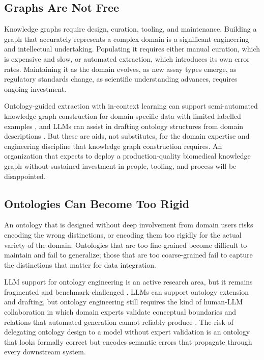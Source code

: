 \documentclass[man,12pt,donotrepeattitle]{apa7}
\begin{document}
\subsection{Graphs Are Not Free}

Knowledge graphs require design, curation, tooling, and maintenance.
Building a graph that accurately represents a complex domain is a
significant engineering and intellectual undertaking. Populating it requires
either manual curation, which is expensive and slow, or automated
extraction, which introduces its own error rates. Maintaining it as the
domain evolves, as new assay types emerge, as regulatory standards change,
as scientific understanding advances, requires ongoing investment.

Ontology-guided extraction with in-context learning can support
semi-automated knowledge graph construction for domain-specific data with
limited labelled examples \parencite{vancauter2024}, and LLMs can assist in
drafting ontology structures from domain descriptions \parencite{lippolis2025}.
But these are aids, not substitutes, for the domain expertise and
engineering discipline that knowledge graph construction requires. An
organization that expects to deploy a production-quality biomedical knowledge
graph without sustained investment in people, tooling, and process will be
disappointed.

\subsection{Ontologies Can Become Too Rigid}

An ontology that is designed without deep involvement from domain users
risks encoding the wrong distinctions, or encoding them too rigidly for the
actual variety of the domain. Ontologies that are too fine-grained become
difficult to maintain and fail to generalize; those that are too
coarse-grained fail to capture the distinctions that matter for data
integration.

LLM support for ontology engineering is an active research area, but it
remains fragmented and benchmark-challenged \parencite{garijo2025}. LLMs
can support ontology extension and drafting, but ontology engineering still
requires the kind of human-LLM collaboration in which domain experts
validate conceptual boundaries and relations that automated generation
cannot reliably produce \parencite{garciafernandez2025}. The risk of
delegating ontology design to a model without expert validation is an
ontology that looks formally correct but encodes semantic errors that
propagate through every downstream system.
\end{document}
